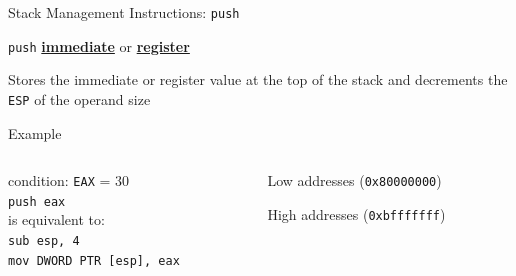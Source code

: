 \documentclass[]{beamer}
\begin{document}
\begin{frame}[fragile]{Stack Management Instructions: {\tt push}}
	\par\noindent{}
	\centerline{{\tt push} \underline{{\bf immediate}} or \underline{\bf register}}
	\par\noindent Stores the immediate or register value at the top of the stack and decrements the {\tt ESP} of the operand size
	
	\begin{block}{Example}
	\begin{columns}
	\begin{column}{0.45\textwidth}
	 condition: {\tt EAX} = $30$ \\[.5em]
	{\tt push eax} \\[1em]
	is equivalent to: \\[1em]
	\alert<2>{{\small\tt sub esp, 4} \\}
	\alert<3>{{\small\tt mov DWORD PTR [esp], eax}}
	\end{column}
	
	\begin{column}{0.4\textwidth}
		\centering\par
		{\scriptsize Low addresses ({\tt 0x80000000})}\\[.5em]
		\begin{drawstack}[scale=0.7]
		\cell{}
		\cell{}
		 \only<1>{\cellptr{{\tt ESP}}}
		\end{drawstack}
		{\scriptsize High addresses ({\tt 0xbfffffff})}
	\end{column}	
	\end{columns}
	\end{block}
\end{frame}
\end{document}
